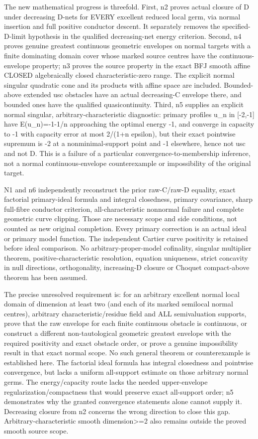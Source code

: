 \documentclass[11pt]{article}
\begin{document}
The new mathematical progress is threefold. First, n2 proves actual closure of D under decreasing D-nets for EVERY excellent reduced local germ, via normal insertion and full positive conductor descent. It separately removes the specified-D-limit hypothesis in the qualified decreasing-net energy criterion. Second, n4 proves genuine greatest continuous geometric envelopes on normal targets with a finite dominating domain cover whose marked source centres have the continuous-envelope property; n3 proves the source property in the exact BFJ smooth affine CLOSED algebraically closed characteristic-zero range. The explicit normal singular quadratic cone and its products with affine space are included. Bounded-above extended usc obstacles have an actual decreasing-C envelope there, and bounded ones have the qualified quasicontinuity. Third, n5 supplies an explicit normal singular, arbitrary-characteristic diagnostic: primary profiles u\_n in [-2,-1] have E(u\_n)=-1-1/n approaching the optimal energy -1, and converge in capacity to -1 with capacity error at most 2/(1+n epsilon), but their exact pointwise supremum is -2 at a nonminimal-support point and -1 elsewhere, hence not usc and not D. This is a failure of a particular convergence-to-membership inference, not a normal continuous-envelope counterexample or impossibility of the original target.

N1 and n6 independently reconstruct the prior raw-C/raw-D equality, exact factorial primary-ideal formula and integral closedness, primary covariance, sharp full-fibre conductor criterion, all-characteristic nonnormal failure and complete geometric curve clipping. Those are necessary scope and side conditions, not counted as new original completion. Every primary correction is an actual ideal or primary model function. The independent Cartier curve positivity is retained before ideal comparison. No arbitrary-proper-model cofinality, singular multiplier theorem, positive-characteristic resolution, equation uniqueness, strict concavity in null directions, orthogonality, increasing-D closure or Choquet compact-above theorem has been assumed.

The precise unresolved requirement is: for an arbitrary excellent normal local domain of dimension at least two (and each of its marked semilocal normal centres), arbitrary characteristic/residue field and ALL semivaluation supports, prove that the raw envelope for each finite continuous obstacle is continuous, or construct a different non-tautological geometric greatest envelope with the required positivity and exact obstacle order, or prove a genuine impossibility result in that exact normal scope. No such general theorem or counterexample is established here. The factorial ideal formula has integral closedness and pointwise convergence, but lacks a uniform all-support estimate on those arbitrary normal germs. The energy/capacity route lacks the needed upper-envelope regularization/compactness that would preserve exact all-support order; n5 demonstrates why the granted convergence statements alone cannot supply it. Decreasing closure from n2 concerns the wrong direction to close this gap. Arbitrary-characteristic smooth dimension>=2 also remains outside the proved smooth source scope.
\end{document}
